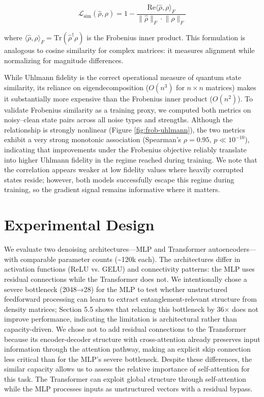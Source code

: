 \documentclass[11pt]{article}
\begin{document}
$$
\mathcal{L}_{\text{sim}}(\hat{\rho}, \rho) = 1 - \frac{\mathrm{Re}\langle \hat{\rho}, \rho \rangle_F}{\lVert \hat{\rho} \rVert_F \cdot \lVert \rho \rVert_F}
$$

where \(\langle \hat{\rho}, \rho \rangle_F = \mathrm{Tr}(\hat{\rho}^\dagger \rho)\) is the Frobenius inner product. This formulation is analogous to cosine similarity for complex matrices: it measures alignment while normalizing for magnitude differences.

While Uhlmann fidelity is the correct operational measure of quantum state similarity, its reliance on eigendecomposition (\(O(n^3)\) for \(n \times n\) matrices) makes it substantially more expensive than the Frobenius inner product (\(O(n^2)\)). To validate Frobenius similarity as a training proxy, we computed both metrics on noisy–clean state pairs across all noise types and strengths. Although the relationship is strongly nonlinear (Figure \ref{fig:frob-uhlmann}), the two metrics exhibit a very strong monotonic association (Spearman's \(\rho = 0.95\), \(p \ll 10^{-10}\)), indicating that improvements under the Frobenius objective reliably translate into higher Uhlmann fidelity in the regime reached during training. We note that the correlation appears weaker at low fidelity values where heavily corrupted states reside; however, both models successfully escape this regime during training, so the gradient signal remains informative where it matters.

\newpage
\section{Experimental Design}
\label{sec:orga7ae74e}
We evaluate two denoising architectures—MLP and Transformer autoencoders—with comparable parameter counts (\textasciitilde{}120k each). The architectures differ in activation functions (ReLU vs. GELU) and connectivity patterns: the MLP uses residual connections while the Transformer does not. We intentionally chose a severe bottleneck (2048→28) for the MLP to test whether unstructured feedforward processing can learn to extract entanglement-relevant structure from density matrices; Section 5.5 shows that relaxing this bottleneck by 36× does not improve performance, indicating the limitation is architectural rather than capacity-driven. We chose not to add residual connections to the Transformer because its encoder-decoder structure with cross-attention already preserves input information through the attention pathway, making an explicit skip connection less critical than for the MLP's severe bottleneck. Despite these differences, the similar capacity allows us to assess the relative importance of self-attention for this task. The Transformer can exploit global structure through self-attention while the MLP processes inputs as unstructured vectors with a residual bypass.
\end{document}
